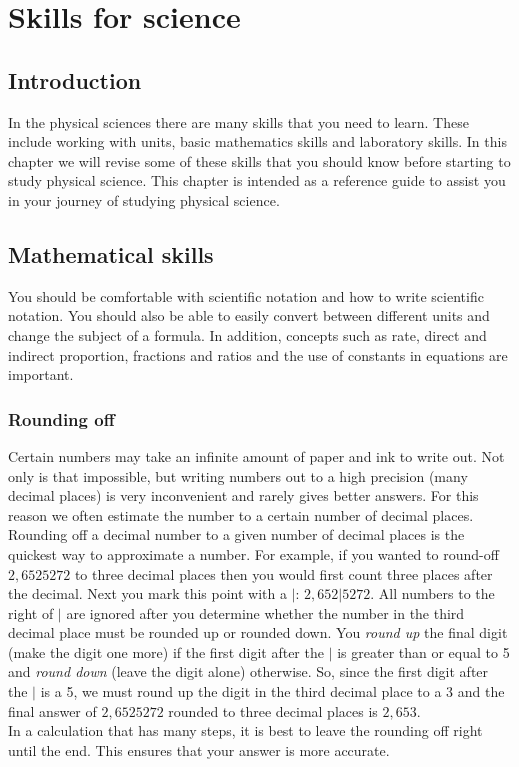          \chapter{Skills for science}
    \setcounter{figure}{1}\setcounter{subfigure}{1}\label{m30853}
    \section{Introduction}
            \nopagebreak
In the physical sciences there are many skills that you need to learn. These include working with units, basic mathematics skills and laboratory skills. In this chapter we will revise some of these skills that you should know before starting to study physical science. This chapter is intended as a reference guide to assist you in your journey of studying physical science. 
\section{Mathematical skills}
You should be comfortable with scientific notation and how to write scientific notation. You should also be able to easily convert between different units and change the subject of a formula. In addition, concepts such as rate, direct and indirect proportion, fractions and ratios and the use of constants in equations are important. 
\subsection*{Rounding off}
Certain numbers may take an infinite amount of paper and ink to write out. Not only is that impossible, but writing numbers out to a high precision (many decimal places) is very inconvenient and rarely gives better answers. For this reason we often estimate the number to a certain number of decimal places. \\
Rounding off a decimal number to a given number of decimal places is the quickest way to approximate a number. For example, if you wanted to round-off $2,6525272$ to three decimal places then you would first count three places after the decimal. Next you mark this point with a $|$: $2,652|5272$. All numbers to the right of $|$ are ignored after you determine whether the number in the third decimal place must be rounded up or rounded down. You \textsl{round up} the final digit (make the digit one more) if the first digit after the $|$ is greater than or equal to 5 and \textsl{round down} (leave the digit alone) otherwise. So, since the first digit after the $|$ is a 5, we must round up the digit in the third decimal place to a 3 and the final answer of $2,6525272$ rounded to three decimal places is $2,653$. \\
In a calculation that has many steps, it is best to leave the rounding off right until the end. This ensures that your answer is more accurate.
